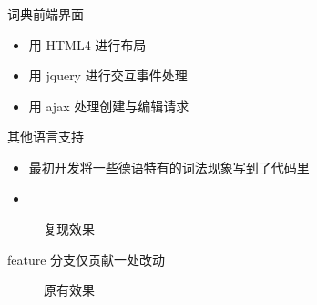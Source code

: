 \documentclass[notheorems,xetex]{beamer}
\begin{document}
\begin{frame}{词典前端界面}
\begin{itemize}
	\item 用 HTML4 进行布局
	\item 用 jquery 进行交互事件处理
	\item 用 ajax 处理创建与编辑请求
\end{itemize}
\begin{figure}
\end{figure}

\end{frame}
\begin{frame}{其他语言支持}
\begin{itemize}
	\item 最初开发将一些德语特有的词法现象写到了代码里
	\item 
\end{itemize}
\begin{figure}
\caption{复现效果}
\end{figure}
\begin{center}
feature 分支仅贡献一处改动
\end{center}
\begin{figure}
	\caption{原有效果}
\end{figure}
\end{frame}




\end{document}
